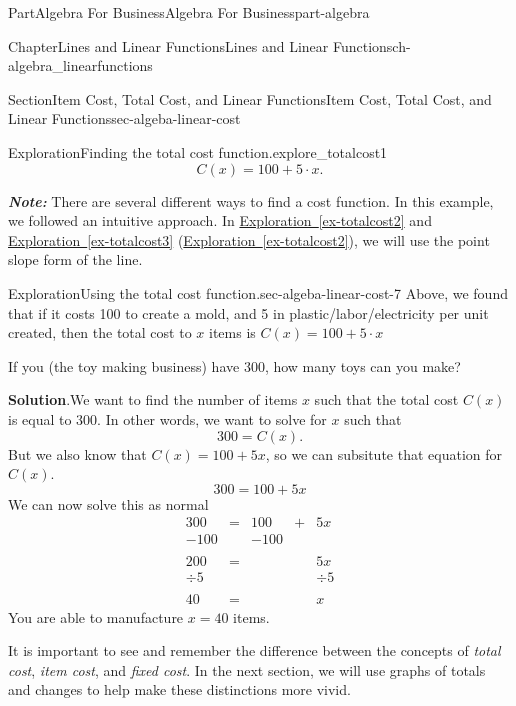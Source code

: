 \documentclass[oneside,10pt,]{tufte-book}
\newcommand{\blocktitlefont}{\relax}
\newcommand{\xreffont}{\relax}
\newcommand{\alert}[1]{\textbf{\textit{#1}}}
\numberwithin{equation}{chapter}
\newcommand{\amp}{&}
\begin{document}
\begin{partptx}{Part}{Algebra For Business}{}{Algebra For Business}{}{}{part-algebra}
\begin{chapterptx}{Chapter}{Lines and Linear Functions}{}{Lines and Linear Functions}{}{}{ch-algebra_linearfunctions}
\begin{sectionptx}{Section}{Item Cost, Total Cost, and Linear Functions}{}{Item Cost, Total Cost, and Linear Functions}{}{}{sec-algeba-linear-cost}
\begin{exploration}{Exploration}{Finding the total cost function.}{explore_totalcost1}
\begin{equation*}
C(x) = 100 + 5\cdot x\text{.}
\end{equation*}
%
\par
\alert{Note:} There are several different ways to find a cost function. In this example, we followed an intuitive approach. In \hyperref[ex-totalcost2]{Exploration~{\xreffont\ref{ex-totalcost2}}} and \hyperref[ex-totalcost3]{Exploration~{\xreffont\ref{ex-totalcost3}}} (\hyperref[ex-totalcost2]{Exploration~{\xreffont\ref{ex-totalcost2}}\textendash{}{\xreffont\ref{ex-totalcost3}}}), we will use the point slope form of the line.%
\end{exploration}%
\begin{exploration}{Exploration}{Using the total cost function.}{sec-algeba-linear-cost-7}%
Above, we found that if it costs \textdollar{}100 to create a mold, and \textdollar{}5 in plastic\slash{}labor\slash{}electricity per unit created, then the total cost to \(x\) items is  \(C(x) = 100 + 5\cdot x\)%
\par
If you (the toy making business) have \textdollar{}300, how many toys can you make?%
\par\smallskip%
\noindent\textbf{\blocktitlefont Solution}.\hypertarget{sec-algeba-linear-cost-7-3}{}\quad{}We want to find the number of items \(x\) such that the total cost \(C(x)\) is equal to 300.  In other words, we want to solve for \(x\) such that%
\begin{equation*}
300 = C(x)\text{.}
\end{equation*}
But we also know that \(C(x)=100+5x\), so we can subsitute that equation for \(C(x)\).%
\begin{equation*}
300 = 100 + 5x
\end{equation*}
We can now solve this as normal%
\begin{align*}
300 \amp =\amp 100 \amp + \amp 5x\\
-100\amp  \amp -100 \amp   \amp \\
\amp \\
200 \amp =\amp \amp   \amp 5x\\
\div 5 \amp\amp \amp \amp \div 5 \\
\amp \\
40 \amp =\amp \amp \amp x
\end{align*}
You are able to manufacture \(x=40\) items.%
\end{exploration}%
It is important to see and remember the difference between the concepts of \emph{total cost}, \emph{item cost}, and \emph{fixed cost}.  In the next section, we will use graphs of totals and changes to help make these distinctions more vivid.%

\end{sectionptx}
\end{chapterptx}
\end{partptx}
\end{document}
